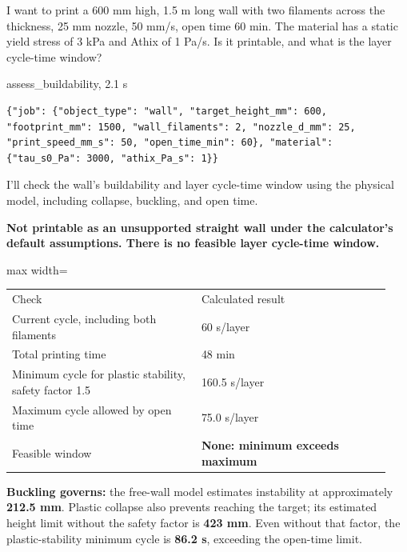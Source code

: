 \begin{userbox}
I want to print a 600 mm high, 1.5 m long wall with two filaments across the thickness, 25 mm nozzle, 50 mm/s, open time 60 min. The material has a static yield stress of 3 kPa and Athix of 1 Pa/s. Is it printable, and what is the layer cycle-time window?
\end{userbox}
\begin{toolbox}{assess\_buildability, 2.1 s}
\begin{lstlisting}[style=argstyle]
{"job": {"object_type": "wall", "target_height_mm": 600, "footprint_mm": 1500, "wall_filaments": 2, "nozzle_d_mm": 25, "print_speed_mm_s": 50, "open_time_min": 60}, "material": {"tau_s0_Pa": 3000, "athix_Pa_s": 1}}
\end{lstlisting}
\end{toolbox}
\begin{agentbox}
I'll check the wall's buildability and layer cycle-time window using the physical model, including collapse, buckling, and open time.\par
\textbf{Not printable as an unsupported straight wall under the calculator's default assumptions. There is no feasible layer cycle-time window.}\par
\par
\par\smallskip\begin{adjustbox}{max width=\linewidth}\begin{tabular}{p{0.47\linewidth}p{0.47\linewidth}}
Check & Calculated result \\
Current cycle, including both filaments & 60 s/layer \\
Total printing time & 48 min \\
Minimum cycle for plastic stability, safety factor 1.5 & 160.5 s/layer \\
Maximum cycle allowed by open time & 75.0 s/layer \\
Feasible window & \textbf{None: minimum exceeds maximum} \\
\end{tabular}\end{adjustbox}\par\smallskip
\par
\textbf{Buckling governs:} the free-wall model estimates instability at approximately \textbf{212.5 mm}. Plastic collapse also prevents reaching the target; its estimated height limit without the safety factor is \textbf{423 mm}. Even without that factor, the plastic-stability minimum cycle is \textbf{86.2 s}, exceeding the open-time limit.\par

\end{agentbox}
